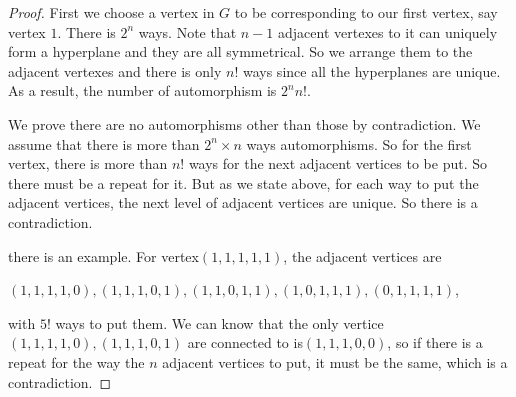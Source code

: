 




\begin{proof}

First we choose a vertex in $G$ to be corresponding to our first vertex, say vertex $1$. There is $2^n$ ways. Note that $n-1$ adjacent vertexes to it can uniquely form a hyperplane and they are all symmetrical. So we arrange them to the adjacent vertexes and there is only $n!$ ways since all the hyperplanes are unique.
As a result, the number of automorphism is $2^nn!$.

 \par We prove there are no automorphisms other than those by contradiction. We assume that there is more than $2^n\times n$ ways automorphisms. So for the first vertex, there is more than $n!$ ways for the next adjacent vertices to be put. So there must be a repeat for it. But as we state above, for each way to put the adjacent vertices, the next level of adjacent vertices are unique. So there is a contradiction. 
 \par there is an example. For vertex$(1,1,1,1,1)$, the adjacent vertices are
 \begin{center}
 $(1,1,1,1,0),(1,1,1,0,1),(1,1,0,1,1),(1,0,1,1,1),(0,1,1,1,1)$,
  \end{center}
  with $5!$ ways to put them. We can know that the only vertice $(1,1,1,1,0),(1,1,1,0,1)$ are connected to is$(1,1,1,0,0)$, so if there is a repeat for the way the $n$ adjacent vertices to put, it must be the same, which is a contradiction.
\end{proof}
